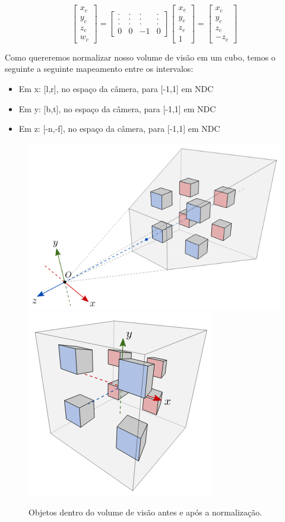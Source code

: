 \documentclass[12pt]{article}
\begin{document}
\[
\begin{bmatrix}
    x_c \\
    y_c \\
    z_c \\
    w_c
\end{bmatrix}
=
\begin{bmatrix}
    . & . & . & . \\
    . & . & . & . \\
    . & . & . & . \\
    0 & 0 & -1 & 0
\end{bmatrix}
\begin{bmatrix}
    x_e \\
    y_e \\
    z_e \\
    1
\end{bmatrix}
=
\begin{bmatrix}
    x_c \\
    y_c \\
    z_c \\
    -z_e
\end{bmatrix}
\]

Como quereremos normalizar nosso volume de visão em um cubo, temos o seguinte a seguinte mapeamento entre os intervalos:

\begin{itemize}
    \item Em x: [l,r], no espaço da câmera, para [-1,1] em NDC
    \item Em y: [b,t], no espaço da câmera, para [-1,1] em NDC
    \item Em z: [-n,-f], no espaço da câmera, para [-1,1] em NDC
\end{itemize}

\begin{figure}
    \centering
    \includegraphics[height=0.3\linewidth]{imgs/Screenshot 2023-11-20 at 15-40-45 8.2 Projeção perspectiva MCTA008-17 Computação Gráfica.png}
    \includegraphics[height=0.3\linewidth]{imgs/Screenshot 2023-11-20 at 22-31-11 8.2 Projeção perspectiva MCTA008-17 Computação Gráfica.png}
    \caption{Objetos dentro do volume de visão antes e após a normalização.}
\end{figure}
\end{document}
